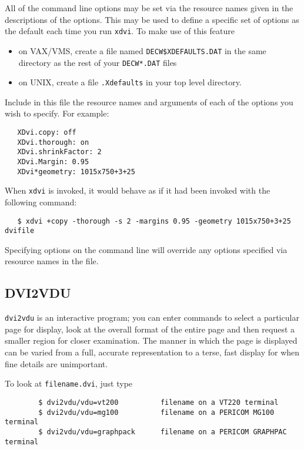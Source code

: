    All of the command line options may be set via the resource names given in
   the descriptions of the options.  This may be used to define a
   specific set of options as the default each time you run \verb+xdvi+.  To make use
   of this feature \begin{itemize}
\item on VAX/VMS, create a file named {\tt DECW\$XDEFAULTS.DAT} in the same
directory as the rest of your {\tt DECW*.DAT} files
\item on UNIX, create a file {\tt .Xdefaults} in your top level directory.
\end{itemize}
  Include in this file the resource names
   and arguments of each of the options you wish to specify.  For example:
\begin{verbatim}
   XDvi.copy: off
   XDvi.thorough: on
   XDvi.shrinkFactor: 2
   XDvi.Margin: 0.95
   XDvi*geometry: 1015x750+3+25
\end{verbatim}
   When \verb+xdvi+ is invoked, it would behave as if it had been invoked with the
   following command:
\begin{verbatim}
   $ xdvi +copy -thorough -s 2 -margins 0.95 -geometry 1015x750+3+25 dvifile
\end{verbatim}
   Specifying options on the command line will override any options specified
   via resource names in the  file.








\subsection{DVI2VDU}
\label{se:dvi2vdu}


{\tt dvi2vdu} is an interactive program; you can enter commands to
select a particular page for display, look at the overall format of the entire
page and then request a smaller region for closer examination.
The manner in which the page is displayed can be varied from a full,
accurate representation to a terse, fast display for when fine details are
unimportant.

To look at \hbox{\verb|filename.dvi|}, just type
\begin{verbatim}
        $ dvi2vdu/vdu=vt200          filename on a VT220 terminal
        $ dvi2vdu/vdu=mg100          filename on a PERICOM MG100 terminal
        $ dvi2vdu/vdu=graphpack      filename on a PERICOM GRAPHPAC terminal
\end{verbatim}

